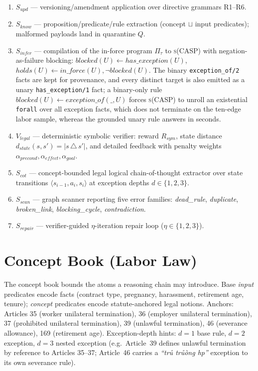 \documentclass[11pt]{article}
\begin{document}
\begin{enumerate}
  \itemsep0pt
  \item $S_{upd}$ --- versioning/amendment application over directive grammars R1--R6.
  \item $S_{know}$ --- proposition/predicate/rule extraction (concept $\sqcup$ input predicates); malformed payloads land in quarantine $Q$.
  \item $S_{infer}$ --- compilation of the in-force program $\Pi_\tau$ to \textsc{s(CASP)} with negation-as-failure blocking:
        $\mathit{blocked}(U) \leftarrow \mathit{has\_exception}(U)$, $\mathit{holds}(U) \leftarrow \mathit{in\_force}(U), \neg \mathit{blocked}(U)$.
        The binary \texttt{exception\_of/2} facts are kept for provenance, and every distinct target is
        also emitted as a unary \texttt{has\_exception/1} fact; a binary-only rule
        $\mathit{blocked}(U) \leftarrow \mathit{exception\_of}(\_,U)$ forces \textsc{s(CASP)} to unroll an
        existential \texttt{forall} over all exception facts, which does not terminate on the ten-edge
        labor sample, whereas the grounded unary rule answers in seconds.
  \item $V_{legal}$ --- deterministic symbolic verifier: reward $R_{sym}$, state distance $d_{state}(s,s')=|s\,\triangle\,s'|$, and detailed feedback with penalty weights $\alpha_{precond},\alpha_{effect},\alpha_{goal}$.
  \item $S_{cot}$ --- concept-bounded legal logical chain-of-thought extractor over state transitions $\langle s_{i-1}, a_i, s_i\rangle$ at exception depths $d\in\{1,2,3\}$.
  \item $S_{scan}$ --- graph scanner reporting five error families: \emph{dead\_rule}, \emph{duplicate}, \emph{broken\_link}, \emph{blocking\_cycle}, \emph{contradiction}.
  \item $S_{repair}$ --- verifier-guided $\eta$-iteration repair loop ($\eta\in\{1,2,3\}$).
\end{enumerate}

\section{Concept Book (Labor Law)}
The concept book bounds the atoms a reasoning chain may introduce. Base \emph{input}
predicates encode facts (contract type, pregnancy, harassment, retirement age, tenure);
\emph{concept} predicates encode statute-anchored legal notions. Anchors: Articles
35 (worker unilateral termination), 36 (employer unilateral termination), 37 (prohibited
unilateral termination), 39 (unlawful termination), 46 (severance allowance), 169
(retirement age). Exception-depth hints: $d{=}1$ base rule, $d{=}2$ exception, $d{=}3$
nested exception (e.g.\ Article~39 defines unlawful termination by reference to
Articles 35--37; Article~46 carries a \emph{``tr\r u tr\r u\`ong h\dj p''} exception to
its own severance rule).
\end{document}
